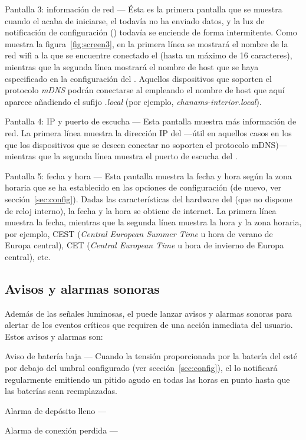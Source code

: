 \begin{descriptioncompact}
\item[Pantalla 3: información de red] --- Ésta es la primera pantalla que se muestra cuan\-do el \MIE acaba de iniciarse, el \MEE todavía no ha enviado datos, y la luz de notificación de configuración  () todavía se enciende de forma intermitente. Como muestra la figura~\ref{fig:screen3}, en la primera línea se mostrará el nombre de la red wifi a la que se encuentre conectado el \ME (hasta un máximo de 16 caracteres), mientras que la segunda línea mostrará el nombre de host que se haya especificado en la configuración del \MI. Aquellos dispositivos que soporten el protocolo \emph{mDNS} podrán conectarse al \MI empleando el nombre de host que aquí aparece añadiendo el sufijo \emph{.local} (por ejemplo, \emph{chanams-interior.local}). 

\item[Pantalla 4: IP y puerto de escucha] --- Esta pantalla muestra más información de red. La primera línea muestra la dirección IP del \MIE ---útil en aquellos casos en los que los dispositivos que se deseen conectar no soporten el protocolo mDNS)--- mientras que la segunda línea muestra el puerto de escucha del \MI. 

\item[Pantalla 5: fecha y hora] --- Esta pantalla muestra la fecha y hora según la zona horaria que se ha establecido en las opciones de configuración (de nuevo, ver sección~\ref{sec:config}). Dadas las características del hardware del \CMS (que no dispone de reloj interno), la fecha y la hora se obtiene de internet. La primera línea muestra la fecha, mientras que la segunda línea muestra la hora y la zona horaria, por ejemplo, CEST (\textit{Central European Summer Time} u hora de verano de Europa central), CET (\textit{Central European Time} u hora de invierno de Europa central), etc.

\end{descriptioncompact}


\subsection{Avisos y alarmas sonoras}

Además de las señales luminosas, el \CMS puede lanzar avisos y alarmas sonoras para alertar de los eventos críticos que requiren de una acción inmediata del usuario. Estos avisos y alarmas son:

\begin{descriptioncompact}

\item[Aviso de batería baja] --- Cuando la tensión proporcionada por la batería del \MEE esté por debajo del umbral configurado (ver sección~\ref{sec:config}), el \MIE lo notificará regularmente emitiendo un pitido agudo en todas las horas en punto hasta que las baterías sean reemplazadas.

\item[Alarma de depósito lleno] ---  

\item[Alarma de conexión perdida] ---  


\end{descriptioncompact}

